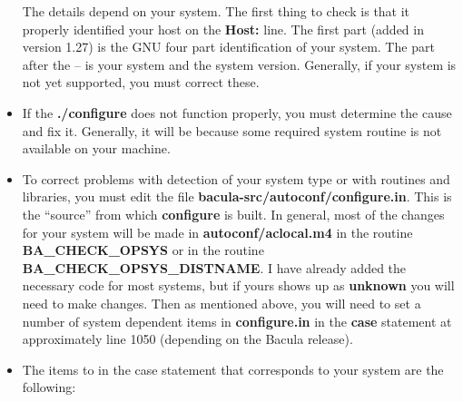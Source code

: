 \begin{itemize}
The details depend on your system. The first thing to check is that  it
properly identified your host on the {\bf Host:} line. The  first part (added
in version 1.27) is the GNU four part identification  of your system. The part
after the -- is your system and the system version.  Generally, if your system
is not yet supported, you must correct these. 
\item If the {\bf ./configure} does not function properly, you must  determine
   the cause and fix it. Generally, it will be because some  required system
   routine is not available on your machine. 
\item To correct problems with detection of your system type or with routines 
   and libraries, you must edit the file {\bf
   \lt{}bacula-src\gt{}/autoconf/configure.in}.  This is the ``source'' from
which {\bf configure} is built.  In general, most of the changes for your
system will be made in  {\bf autoconf/aclocal.m4} in the routine {\bf
BA\_CHECK\_OPSYS} or  in the routine {\bf BA\_CHECK\_OPSYS\_DISTNAME}. I have
already added the  necessary code for most systems, but if yours shows up as
{\bf unknown}  you will need to make changes. Then as mentioned above, you
will need  to set a number of system dependent items in {\bf configure.in} in
the  {\bf case} statement at approximately line 1050 (depending on the  Bacula
release). 
\item The items to in the case statement that corresponds to your system  are
   the following:  


\end{itemize}
